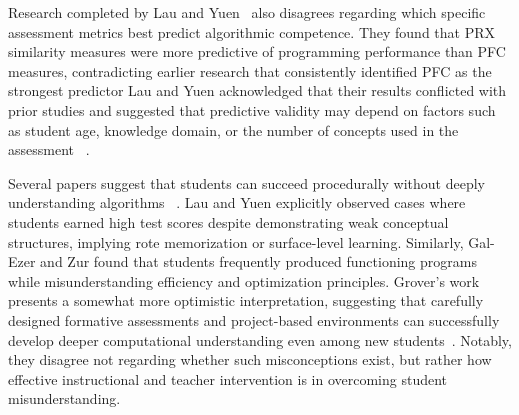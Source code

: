 Research completed by Lau and Yuen~\cite{lau2009} also disagrees regarding which specific assessment metrics best predict algorithmic competence.
They found that PRX similarity measures were more predictive of programming performance than PFC measures, contradicting earlier research that
  consistently identified PFC as the strongest predictor Lau and Yuen acknowledged that their results conflicted with prior studies and suggested that
  predictive validity may depend on factors such as student age, knowledge domain, or the number of concepts used in the assessment
~\cite{trumpower2004structural,davis2003evaluating}.

Several papers suggest that students can succeed procedurally without deeply understanding algorithms
~\cite{grover2017assessing,lau2009,gal2004efficiency}.
Lau and Yuen explicitly observed cases where students earned high test scores despite demonstrating weak conceptual structures, implying rote
  memorization or surface-level learning.
Similarly, Gal-Ezer and Zur found that students frequently produced functioning programs while misunderstanding efficiency and optimization
  principles.
Grover's work presents a somewhat more optimistic interpretation, suggesting that carefully designed formative assessments and project-based
  environments can successfully develop deeper computational understanding even among new students~\cite{grover2017assessing}.
Notably, they disagree not regarding whether such misconceptions exist, but rather how effective instructional and teacher intervention is in
  overcoming student misunderstanding.
